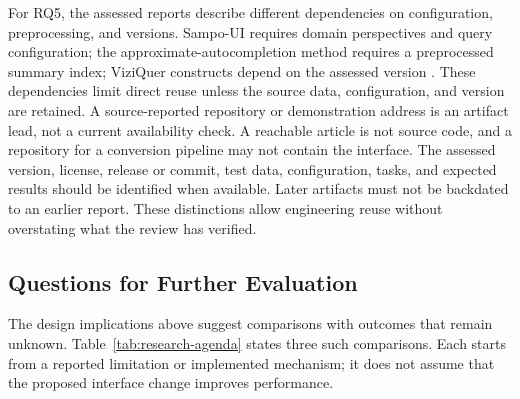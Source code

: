 \documentclass[manuscript,review,screen]{acmart}
\begin{document}
For RQ5, the assessed reports describe different dependencies on configuration, preprocessing, and versions. Sampo-UI requires domain perspectives and query configuration; the approximate-autocompletion method requires a preprocessed summary index; ViziQuer constructs depend on the assessed version \citep{2022_Ikkala_Sampo-UI_A,2021_Parra_Fast_Approximate,2018_Cerans_ViziQuer_A,V3-01013}. These dependencies limit direct reuse unless the source data, configuration, and version are retained. A source-reported repository or demonstration address is an artifact lead, not a current availability check. A reachable article is not source code, and a repository for a conversion pipeline may not contain the interface. The assessed version, license, release or commit, test data, configuration, tasks, and expected results should be identified when available. Later artifacts must not be backdated to an earlier report. These distinctions allow engineering reuse without overstating what the review has verified.

\subsection{Questions for Further Evaluation}
The design implications above suggest comparisons with outcomes that remain unknown. Table~\ref{tab:research-agenda} states three such comparisons. Each starts from a reported limitation or implemented mechanism; it does not assume that the proposed interface change improves performance.
\end{document}
